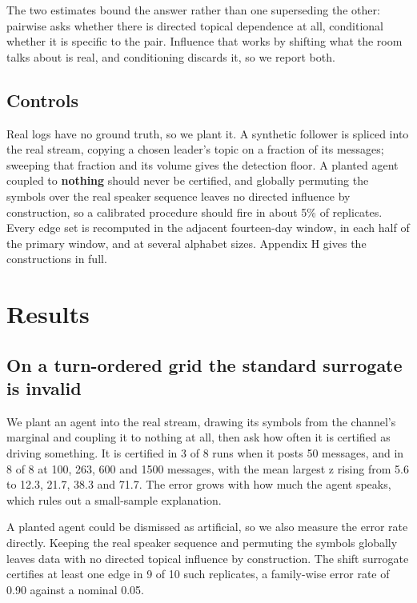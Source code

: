 \documentclass[11pt]{article}
\begin{document}
The two estimates bound the answer rather than one superseding the other: pairwise asks whether there is directed topical dependence at all, conditional whether it is specific to the pair. Influence that works by shifting what the room talks about is real, and conditioning discards it, so we report both.

\subsection{Controls}

Real logs have no ground truth, so we plant it. A synthetic follower is spliced into the real stream, copying a chosen leader's topic on a fraction of its messages; sweeping that fraction and its volume gives the detection floor. A planted agent coupled to \textbf{nothing} should never be certified, and globally permuting the symbols over the real speaker sequence leaves no directed influence by construction, so a calibrated procedure should fire in about 5\% of replicates. Every edge set is recomputed in the adjacent fourteen-day window, in each half of the primary window, and at several alphabet sizes. Appendix H gives the constructions in full.

\section{Results}

\subsection{On a turn-ordered grid the standard surrogate is invalid}

We plant an agent into the real stream, drawing its symbols from the channel's marginal and coupling it to nothing at all, then ask how often it is certified as driving something. It is certified in 3 of 8 runs when it posts 50 messages, and in 8 of 8 at 100, 263, 600 and 1500 messages, with the mean largest z rising from 5.6 to 12.3, 21.7, 38.3 and 71.7. The error grows with how much the agent speaks, which rules out a small-sample explanation.

A planted agent could be dismissed as artificial, so we also measure the error rate directly. Keeping the real speaker sequence and permuting the symbols globally leaves data with no directed topical influence by construction. The shift surrogate certifies at least one edge in 9 of 10 such replicates, a family-wise error rate of 0.90 against a nominal 0.05.
\end{document}
